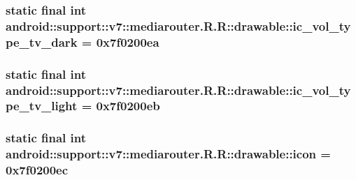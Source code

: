 \hypertarget{classandroid_1_1support_1_1v7_1_1mediarouter_1_1_r_1_1drawable_7fe4ece6d69ab62d5495b69ea5ad8a63}{
\subsubsection[{ic\_\-vol\_\-type\_\-tv\_\-dark}]{\setlength{\rightskip}{0pt plus 5cm}static final int android::support::v7::mediarouter.R.R::drawable::ic\_\-vol\_\-type\_\-tv\_\-dark = 0x7f0200ea}}
\label{classandroid_1_1support_1_1v7_1_1mediarouter_1_1_r_1_1drawable_7fe4ece6d69ab62d5495b69ea5ad8a63}


\hypertarget{classandroid_1_1support_1_1v7_1_1mediarouter_1_1_r_1_1drawable_64cbd7296439d7b40846a11c502594d7}{
\subsubsection[{ic\_\-vol\_\-type\_\-tv\_\-light}]{\setlength{\rightskip}{0pt plus 5cm}static final int android::support::v7::mediarouter.R.R::drawable::ic\_\-vol\_\-type\_\-tv\_\-light = 0x7f0200eb}}
\label{classandroid_1_1support_1_1v7_1_1mediarouter_1_1_r_1_1drawable_64cbd7296439d7b40846a11c502594d7}


\hypertarget{classandroid_1_1support_1_1v7_1_1mediarouter_1_1_r_1_1drawable_695c768cab85f19bff0bbd3f9916d5cd}{
\subsubsection[{icon}]{\setlength{\rightskip}{0pt plus 5cm}static final int android::support::v7::mediarouter.R.R::drawable::icon = 0x7f0200ec}}
\label{classandroid_1_1support_1_1v7_1_1mediarouter_1_1_r_1_1drawable_695c768cab85f19bff0bbd3f9916d5cd}


